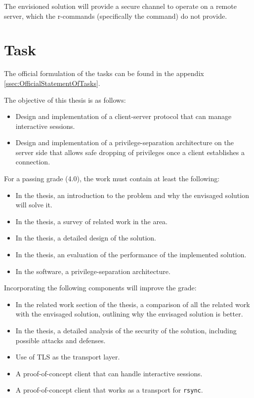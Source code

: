 \documentclass[10pt,a4paper,titlepage,twoside,english,final]{zhawreprt}
\begin{document}
The envisioned solution will provide a secure channel to operate on a remote server, which the r-commands (specifically the \cite{rlogin} command) do not provide.


\section{Task}\label{sec:Task}
The official formulation of the tasks can be found in the appendix \ref{ssec:OfficialStatementOfTasks}.

The objective of this thesis is as follows:
\begin{itemize}
\item Design and implementation of a client-server protocol that can manage interactive sessions.
\item Design and implementation of a privilege-separation architecture on the server side that allows safe dropping of privileges once a client establishes a connection.
\end{itemize}

For a passing grade (4.0), the work must contain at least the following:
\begin{itemize}
\item In the thesis, an introduction to the problem and why the envisaged solution will solve it.
\item In the thesis, a survey of related work in the area.
\item In the thesis, a detailed design of the solution.
\item In the thesis, an evaluation of the performance of the implemented solution.
\item In the software, a privilege-separation architecture.
\end{itemize}

Incorporating the following components will improve the grade:
\begin{itemize}
\item In the related work section of the thesis, a comparison of all the related work with the envisaged solution, outlining why the envisaged solution is better.
\item In the thesis, a detailed analysis of the security of the solution, including possible attacks and defenses.
\item Use of \gls{TLS} as the transport layer.
\item A proof-of-concept client that can handle interactive sessions.
\item A proof-of-concept client that works as a transport for \texttt{rsync}.
\end{itemize}
\end{document}
